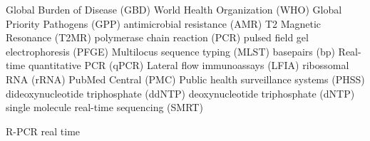 Global Burden of Disease (GBD)
World Health Organization (WHO)
Global Priority Pathogens (GPP)
antimicrobial resistance (AMR)
T2 Magnetic Resonance (T2MR)
polymerase chain reaction (PCR)
pulsed field gel electrophoresis (PFGE)
Multilocus sequence typing (MLST)
basepairs (bp)
Real-time quantitative PCR (qPCR)
Lateral flow immunoassays (LFIA)
ribossomal RNA (rRNA)
PubMed Central\textsuperscript{\small\textregistered} (PMC)
Public health surveillance systems (PHSS)
dideoxynucleotide triphosphate (ddNTP) 
deoxynucleotide triphosphate (dNTP)
single molecule real-time sequencing (SMRT)

R-PCR real time 